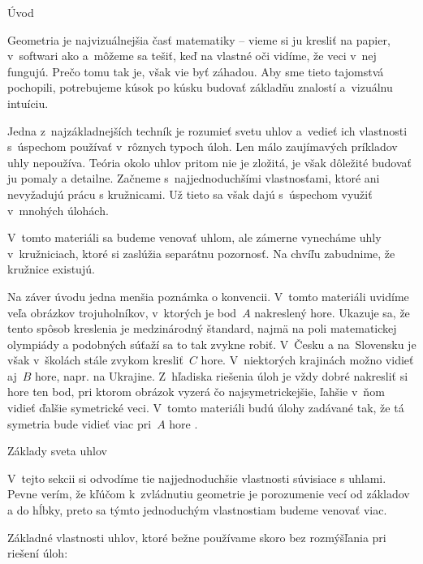 





\sec Úvod

Geometria je najvizuálnejšia časť matematiky -- vieme si ju kresliť na papier, v~softwari ako  a~môžeme sa tešiť, keď na vlastné oči vidíme, že veci v~nej fungujú. Prečo tomu tak je, však vie byť záhadou. Aby sme tieto tajomstvá pochopili, potrebujeme kúsok po kúsku budovať základňu znalostí a~vizuálnu intuíciu. 

Jedna z~najzákladnejších techník je rozumieť svetu uhlov a~vedieť ich vlastnosti s~úspechom používať v~rôznych typoch úloh. Len málo zaujímavých príkladov uhly nepoužíva. Teória okolo uhlov pritom nie je zložitá, je však dôležité budovať ju pomaly a detailne. Začneme s~najjednoduchšími vlastnosťami, ktoré ani nevyžadujú prácu s kružnicami. Už tieto sa však dajú s~úspechom využiť v~mnohých úlohách.

V~tomto materiáli sa budeme venovať uhlom, ale zámerne vynecháme uhly v~kružniciach, ktoré si zaslúžia separátnu pozornosť. Na chvíľu zabudnime, že kružnice existujú.

Na záver úvodu jedna menšia poznámka o konvencii. V~tomto materiáli uvidíme veľa obrázkov trojuholníkov, v~ktorých je bod~$A$ nakreslený hore. Ukazuje sa, že tento spôsob kreslenia je medzinárodný štandard, najmä na poli matematickej olympiády a podobných súťaží sa to tak zvykne robiť. V~Česku a na~Slovensku je však v~školách stále zvykom kresliť~$C$ hore. V~niektorých krajinách možno vidieť aj~$B$ hore, napr. na Ukrajine. Z~hľadiska riešenia úloh je vždy dobré nakresliť si hore ten bod, pri ktorom obrázok vyzerá čo najsymetrickejšie, ľahšie v~ňom vidieť ďalšie symetrické veci. V~tomto materiáli budú úlohy zadávané tak, že tá symetria bude vidieť viac pri~$A$ hore \SlightSmile.

\sec Základy sveta uhlov

V~tejto sekcii si odvodíme tie najjednoduchšie vlastnosti súvisiace s uhlami. Pevne verím, že kľúčom k~zvládnutiu geometrie je porozumenie vecí od základov a do hĺbky, preto sa týmto jednoduchým vlastnostiam budeme venovať viac.

Základné vlastnosti uhlov, ktoré bežne používame skoro bez rozmýšľania pri riešení úloh:

